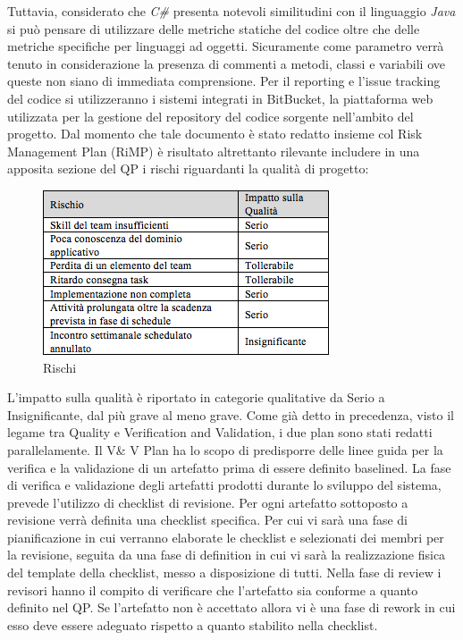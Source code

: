 Tuttavia, considerato che \emph{C\#} presenta notevoli similitudini con il linguaggio \emph{Java} si pu\`{o} pensare di utilizzare delle metriche statiche del codice oltre che delle metriche specifiche per linguaggi ad oggetti.
Sicuramente come parametro verr\`{a} tenuto in considerazione la presenza di commenti a metodi, classi e variabili ove queste non siano di immediata comprensione.
Per il reporting e l\rq issue tracking del codice si utilizzeranno i sistemi integrati in BitBucket, la piattaforma web utilizzata per la gestione del repository del codice sorgente nell\rq ambito del progetto.
Dal momento che tale documento \`{e} stato redatto insieme col Risk Management Plan (RiMP) \`{e} risultato altrettanto rilevante includere in una apposita sezione del QP i rischi riguardanti la qualit\`{a} di progetto:
\begin{figure}[h]
\centering
\includegraphics[scale=.7]{img/12.png}
\caption{Rischi}
\label{fig:cd}
\end{figure}
L\rq impatto sulla qualit\`{a} \`{e} riportato in categorie qualitative da Serio a Insignificante, dal pi\`{u} grave al meno grave.
Come gi\`{a} detto in precedenza, visto il legame tra Quality e Verification and Validation, i due plan sono stati redatti parallelamente.
Il V\& V Plan ha lo scopo di predisporre delle linee guida per la verifica e la validazione di un artefatto prima di essere definito baselined.
La fase di verifica e validazione degli artefatti prodotti durante lo sviluppo del sistema, prevede l\rq utilizzo di checklist di revisione. Per ogni artefatto sottoposto a revisione verr\`{a} definita una checklist specifica. 
Per cui vi sar\`{a} una fase di pianificazione in cui verranno elaborate le checklist e selezionati dei membri per la revisione, seguita da una fase di definition in cui vi sar\`{a} la realizzazione fisica del template della checklist, messo a disposizione di tutti.
Nella fase di review i revisori hanno il compito di verificare che l\rq artefatto sia conforme a quanto definito nel QP.
Se l\rq artefatto non \`{e} accettato allora vi \`{e} una fase di rework in cui esso deve essere adeguato rispetto a quanto stabilito nella checklist.
